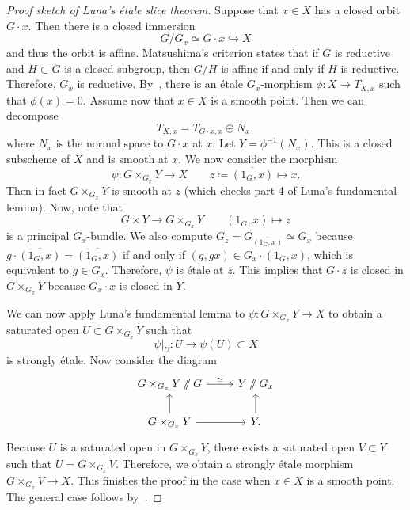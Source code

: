 \documentclass{amsart}
\theoremstyle{definition}
\theoremstyle{remark}
\theoremstyle{plain}
\theoremstyle{definition}
\theoremstyle{remark}
\newcommand{\ol}[1]{\overline{#1}}
\newcommand{\1}{\mathbf{1}}
\newcommand{\2}{\mathbf{2}}
\newcommand{\3}{\mathbf{3}}
\begin{document}
\begin{proof}[Proof sketch of Luna's \'etale slice theorem]
    Suppose that \(x \in X\) has a closed orbit \(G \cdot x\). Then there is a closed immersion
    \[ G / G_x \simeq G \cdot x \hookrightarrow X \]
    and thus the orbit is affine. Matsushima's criterion states that if \(G\) is reductive and \(H \subset G\) is a closed subgroup, then \(G / H\) is affine if and only if \(H\) is reductive. Therefore, \(G_x\) is reductive. By~, there is an \'etale \(G_x\)-morphism \(\phi \colon X \to T_{X,x}\) such that \(\phi(x) = 0\). Assume now that \(x \in X\) is a smooth point. Then we can decompose
    \[ T_{X,x} = T_{G \cdot x, x} \oplus N_x, \]
    where \(N_x\) is the normal space to \(G \cdot x\) at \(x\). Let \(Y = \phi^{-1}(N_x)\). This is a closed subscheme of \(X\) and is smooth at \(x\). We now consider the morphism
    \[ \psi \colon G \times_{G_x} Y \to X \qquad z \coloneqq \ol{(1_G, x)} \mapsto x. \]
    Then in fact \(G \times_{G_x} Y\) is smooth at \(z\) (which checks part 4 of Luna's fundamental lemma). Now, note that 
    \[ G \times Y \to G \times_{G_x} Y \qquad (1_G, x) \mapsto z \]
    is a principal \(G_x\)-bundle. We also compute \(G_z = G_{\ol{(1_G, x)}} \simeq G_x\) because \(g \cdot \ol{(1_G, x)} = \ol{(1_G, x)}\) if and only if \((g, gx) \in G_x \cdot (1_G, x)\), which is equivalent to \(g \in G_x\). Therefore, \(\psi\) is \'etale at \(z\). This implies that \(G \cdot z\) is closed in \(G \times_{G_x} Y\) because \(G_x \cdot x\) is closed in \(Y\). 

    We can now apply Luna's fundamental lemma to \(\psi \colon G \times_{G_x} Y \to X\) to obtain a saturated open \(U \subset G \times_{G_x} Y\) such that
    \[ \psi|_U \colon U \to \psi(U) \subset X \]
    is strongly \'etale. Now consider the diagram
    \begin{equation*}
    \begin{tikzcd}
        G \times_{G_x} Y \sslash G \ar{r}{\simeq} & Y \sslash G_x \\
        G \times_{G_x} Y \ar{r} \ar{u} & Y \ar{u}.
    \end{tikzcd}
    \end{equation*}
    Because \(U\) is a saturated open in \(G \times_{G_x} Y\), there exists a saturated open \(V \subset Y\) such that \(U = G \times_{G_x} V\). Therefore, we obtain a strongly \'etale morphism \(G \times_{G_x} V \to X\). This finishes the proof in the case when \(x \in X\) is a smooth point. The general case follows by~.
\end{proof}
\end{document}
